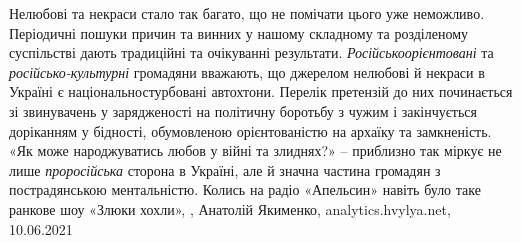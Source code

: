 Нелюбові та некраси стало так багато, що не помічати цього уже неможливо.
Періодичні пошуки причин та винних у нашому складному та розділеному
суспільстві дають традиційні та очікуванні результати. \emph{Російськоорієнтовані} та
\emph{російсько-культурні} громадяни вважають, що джерелом нелюбові й некраси в
Україні є національностурбовані автохтони. Перелік претензій до них починається
зі звинувачень у зарядженості на політичну боротьбу з чужим і закінчується
доріканням у бідності, обумовленою орієнтованістю на архаїку та замкненість.
«Як може народжуватись любов у війні та злиднях?» – приблизно так міркує не
лише \emph{проросійська} сторона в Україні, але й значна частина громадян з
пострадянською ментальністю. Колись на радіо «Апельсин» навіть було таке
ранкове шоу «Злюки хохли»,
, Анатолій Якименко, analytics.hvylya.net, 10.06.2021

